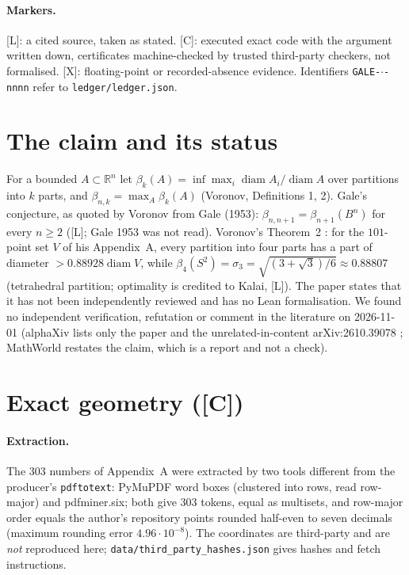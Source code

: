 \documentclass[10pt]{article}
\newcommand{\tier}[1]{\textsf{[#1]}}
\newcommand{\tL}{\tier{L}}
\newcommand{\tC}{\tier{C}}
\newcommand{\tX}{\tier{X}}
\newcommand{\bb}{\beta}
\begin{document}
\noindent{}

\paragraph{Markers.} \tL{}: a cited source, taken as stated. \tC{}: executed exact code with the argument written down, certificates machine-checked by trusted third-party checkers, not formalised. \tX{}: floating-point or recorded-absence evidence. Identifiers \texttt{GALE-$\cdot$-nnnn} refer to \texttt{ledger/ledger.json}.

\section{The claim and its status}\label{sec:claim}
For a bounded $A\subset\mathbb{R}^n$ let $\bb_k(A)=\inf\max_i \operatorname{diam}A_i/\operatorname{diam}A$ over partitions into $k$ parts, and $\bb_{n,k}=\max_A\bb_k(A)$ (Voronov, Definitions 1, 2). Gale's conjecture, as quoted by Voronov from Gale (1953): $\bb_{n,n+1}=\bb_{n+1}(B^n)$ for every $n\ge2$ (\tL{}; Gale 1953 was not read). Voronov's Theorem~2 \cite{vor}: for the $101$-point set $V$ of his Appendix~A, every partition into four parts has a part of diameter $>0.88928\operatorname{diam}V$, while $\bb_4(S^2)=\sigma_3=\sqrt{(3+\sqrt3)/6}\approx0.88807$ (tetrahedral partition; optimality is credited to Kalai, \tL{}). The paper states that it has not been independently reviewed and has no Lean formalisation. We found no independent verification, refutation or comment in the literature on 2026-11-01 (alphaXiv lists only the paper and the unrelated-in-content arXiv:2610.39078 \cite{bor}; MathWorld restates the claim, which is a report and not a check).

\section{Exact geometry (\tC{})}\label{sec:geom}
\paragraph{Extraction.} The $303$ numbers of Appendix~A were extracted by two tools different from the producer's \texttt{pdftotext}: PyMuPDF word boxes (clustered into rows, read row-major) and pdfminer.six; both give $303$ tokens, equal as multisets, and row-major order equals the author's repository points rounded half-even to seven decimals (maximum rounding error $4.96\cdot10^{-8}$). The coordinates are third-party and are \emph{not} reproduced here; \texttt{data/third\_party\_hashes.json} gives hashes and fetch instructions.
\end{document}
